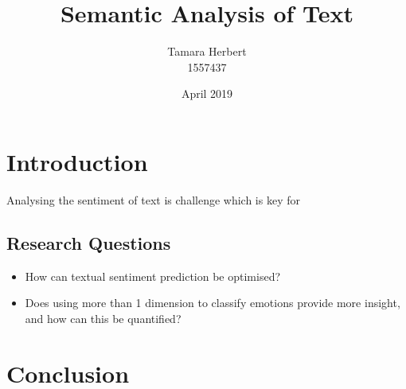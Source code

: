 \documentclass{article}
\title{Semantic Analysis of Text}
\author{Tamara Herbert \\ 1557437}
\date{April 2019}
\begin{document}
\maketitle

\tableofcontents

\pagebreak

\section{Introduction}

Analysing the sentiment of text is challenge which is key for 
\subsection{Research Questions}
\begin{itemize}
    \item How can textual sentiment prediction be optimised?
    \item Does using more than 1 dimension to classify emotions provide more insight, and how can this be quantified?

\end{itemize}





\section{Conclusion}






\end{document}
